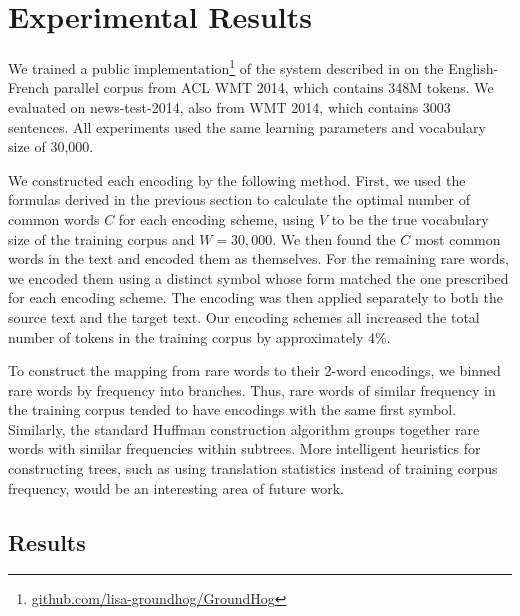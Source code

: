 \section{Experimental Results}
\label{sec:exp}

We trained a public
implementation\footnote{\url{github.com/lisa-groundhog/GroundHog}} of the
system described in  on the English-French
parallel corpus from ACL WMT 2014, which contains 348M tokens. We evaluated on
news-test-2014, also from WMT 2014, which contains 3003 sentences. All
experiments used the same learning parameters and vocabulary size of 30,000.

We constructed each encoding by the following method. First, we used the
formulas derived in the previous section to calculate the optimal number of
common words $C$ for each encoding scheme, using $V$ to be the true vocabulary
size of the training corpus and $W = 30,000$. We then found the $C$ most common
words in the text and encoded them as themselves. For the remaining rare words,
we encoded them using a distinct symbol whose form matched the one prescribed
for each encoding scheme. The encoding was then applied separately to both the
source text and the target text. Our encoding schemes all increased the total
number of tokens in the training corpus by approximately 4\%.

To construct the mapping from rare words to their 2-word encodings, we binned rare
words by frequency into branches. Thus, rare words of similar frequency in the
training corpus tended to have encodings with the same first symbol. Similarly,
the standard Huffman construction algorithm groups together rare words with
similar frequencies within subtrees. More intelligent heuristics for
constructing trees, such as using translation statistics instead of training
corpus frequency, would be an interesting area of future work.

\subsection{Results}

\begin{table}
  \centering
  \vspace{8pt}
  \caption{BLEU scores (\%) on detokenized test set for each encoding
    scheme after training for 5 days.}
  \label{table:results}
\end{table}

